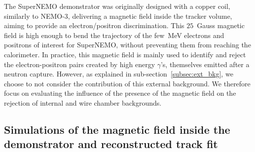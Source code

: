 The SuperNEMO demonstrator was originally designed with a copper coil, similarly to NEMO-$3$, delivering a magnetic field inside the tracker volume, aiming to provide an electron/positron discrimination.
This $25$~Gauss magnetic field is high enough to bend the trajectory of the few~MeV electrons and positrons of interest for SuperNEMO, without preventing them from reaching the calorimeter.
In practice, this magnetic field is mainly used to identify and reject the electron-positron pairs created by high energy $\gamma$’s, themselves emitted after a neutron capture.
However, as explained in sub-section~\ref{subsec:ext_bkg}, we choose to not consider the contribution of this external background.
We therefore focus on evaluating the influence of the presence of the magnetic field on the rejection of internal and wire chamber backgrounds.





\subsection{Simulations of the magnetic field inside the demonstrator and reconstructed track fit}


